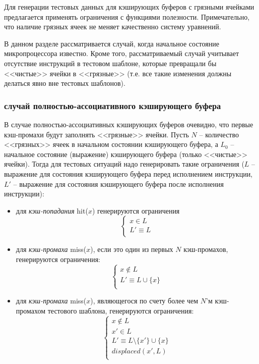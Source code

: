 Для генерации тестовых данных для кэширующих буферов с грязными
ячейками предлагается применять ограничения с функциями полезности.
Примечательно, что наличие грязных ячеек не меняет качественно
систему уравнений.

В данном разделе рассматривается случай, когда начальное состояние
микропроцессора известно. Кроме того, рассматриваемый случай
учитывает отсутствие инструкций в тестовом шаблоне, которые
превращали бы <<чистые>> ячейки в <<грязные>> (т.е. все такие
изменения должны делаться явно вне тестовых шаблонов).

\subsubsection{случай полностью-ассоциативного кэширующего буфера}

В случае полностью-ассоциативных кэширующих буферов очевидно, что
первые кэш-промахи будут заполнять <<грязные>> ячейки. Пусть $N$ --
количество <<грязных>> ячеек в начальном состоянии кэширующего
буфера, а $L_0$ -- начальное состояние (выражение) кэширующего
буфера (только <<чистые>> ячейки). Тогда для тестовых ситуаций надо
генерировать такие ограничения ($L$ -- выражение для состояния
кэширующего буфера перед исполнением инструкции, $L'$ -- выражение
для состояния кэширующего буфера после исполнения инструкции):
\begin{itemize}
\item для \emph{кэш-попадания} hit($x$) генерируются ограничения
$$
\left\{
\begin{array}{l}
x \in L\\
L' \equiv L\\
\end{array}
\right.
$$

\item для \emph{кэш-промаха} miss($x$), если это один из первых $N$
кэш-промахов, генерируются ограничения:
$$
\left\{
\begin{array}{l}
x \notin L\\
L' \equiv L \cup \{x\}\\
\end{array}
\right.
$$

\item для \emph{кэш-промаха} miss($x$), являющегося по счету более
чем $N$'м кэш-промахом тестового шаблона, генерируются ограничения:
$$
\left\{
\begin{array}{l}
x \notin L\\
x' \in L\\
L' \equiv L\setminus\{x'\} \cup \{x\}\\
displaced(x', L)\\
\end{array}
\right.
$$
\end{itemize}

